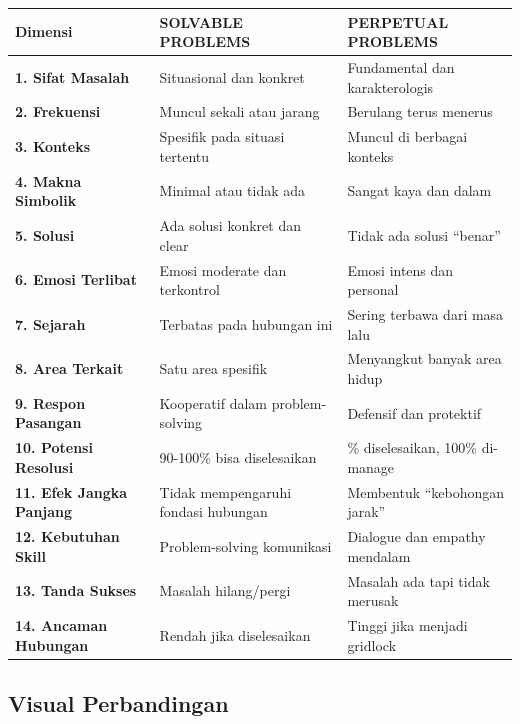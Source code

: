\begin{center}
\renewcommand{\arraystretch}{1.6}
\begin{tabular}{|>{\raggedright}p{3.2cm}|>{\raggedright}p{5.8cm}|>{\raggedright\arraybackslash}p{5.8cm}|}
\hline
\rowcolor{primary!20}
\textbf{Dimensi} & \textbf{SOLVABLE PROBLEMS} & \textbf{PERPETUAL PROBLEMS} \\
\hline
\textbf{1. Sifat Masalah} & Situasional dan konkret & Fundamental dan karakterologis \\
\hline
\textbf{2. Frekuensi} & Muncul sekali atau jarang & Berulang terus menerus \\
\hline
\textbf{3. Konteks} & Spesifik pada situasi tertentu & Muncul di berbagai konteks \\
\hline
\textbf{4. Makna Simbolik} & Minimal atau tidak ada & Sangat kaya dan dalam \\
\hline
\textbf{5. Solusi} & Ada solusi konkret dan clear & Tidak ada solusi ``benar'' \\
\hline
\textbf{6. Emosi Terlibat} & Emosi moderate dan terkontrol & Emosi intens dan personal \\
\hline
\textbf{7. Sejarah} & Terbatas pada hubungan ini & Sering terbawa dari masa lalu \\
\hline
\textbf{8. Area Terkait} & Satu area spesifik & Menyangkut banyak area hidup \\
\hline
\textbf{9. Respon Pasangan} & Kooperatif dalam problem-solving & Defensif dan protektif \\
\hline
\textbf{10. Potensi Resolusi} & 90-100\% bisa diselesaikan & 0\% diselesaikan, 100\% di-manage \\
\hline
\textbf{11. Efek Jangka Panjang} & Tidak mempengaruhi fondasi hubungan & Membentuk ``kebohongan jarak'' \\
\hline
\textbf{12. Kebutuhan Skill} & Problem-solving komunikasi & Dialogue dan empathy mendalam \\
\hline
\textbf{13. Tanda Sukses} & Masalah hilang/pergi & Masalah ada tapi tidak merusak \\
\hline
\textbf{14. Ancaman Hubungan} & Rendah jika diselesaikan & Tinggi jika menjadi gridlock \\
\hline
\end{tabular}
\end{center}

\subsection{Visual Perbandingan}

